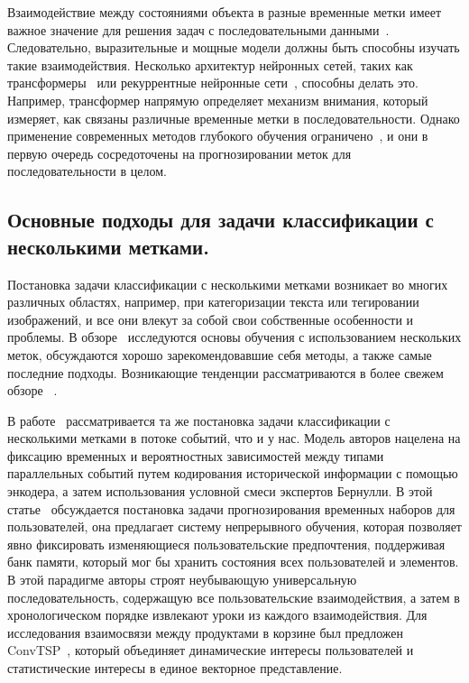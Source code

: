 \documentclass[a4paper, 12pt]{article} %
\begin{document}
Взаимодействие между состояниями объекта в разные временные метки имеет важное значение для решения задач с последовательными данными~\cite{hartvigsen2020recurrent}. Следовательно, выразительные и мощные модели должны быть способны изучать такие взаимодействия. Несколько архитектур нейронных сетей, таких как трансформеры~\cite{vaswani2017attention} или рекуррентные нейронные сети~\cite{grossberg2013recurrent}, способны делать это. Например, трансформер напрямую определяет механизм внимания, который измеряет, как связаны различные временные метки в последовательности. Однако применение современных методов глубокого обучения ограничено~\cite{zhang2020multi}, и они в первую очередь сосредоточены на прогнозировании меток для последовательности в целом. 

\subsection{Основные подходы для задачи классификации с несколькими метками.}
Постановка задачи классификации с несколькими метками возникает во многих различных областях, например, при категоризации текста или тегировании изображений, и все они влекут за собой свои собственные особенности и проблемы. В обзоре~\cite{zhang2013review} исследуются основы обучения с использованием нескольких меток, обсуждаются хорошо зарекомендовавшие себя методы, а также самые последние подходы. Возникающие тенденции рассматриваются в более свежем обзоре ~\cite{liu2021emerging}.

В работе~\cite{shou2023concurrent} рассматривается та же постановка задачи классификации с несколькими метками в потоке событий, что и у нас. Модель авторов нацелена на фиксацию временных и вероятностных зависимостей между типами параллельных событий путем кодирования исторической информации с помощью энкодера, а затем использования условной смеси экспертов Бернулли. В этой статье~\cite{yu2023continuous} обсуждается постановка задачи прогнозирования временных наборов для пользователей, она предлагает систему непрерывного обучения, которая позволяет явно фиксировать изменяющиеся пользовательские предпочтения, поддерживая банк памяти, который мог бы хранить состояния всех пользователей и элементов. В этой парадигме авторы строят неубывающую универсальную последовательность, содержащую все пользовательские взаимодействия, а затем в хронологическом порядке извлекают уроки из каждого взаимодействия. Для исследования взаимосвязи между продуктами в корзине был предложен ConvTSP~\cite{zhang2023conv}, который объединяет динамические интересы пользователей и статистические интересы в единое векторное представление.
\end{document}
